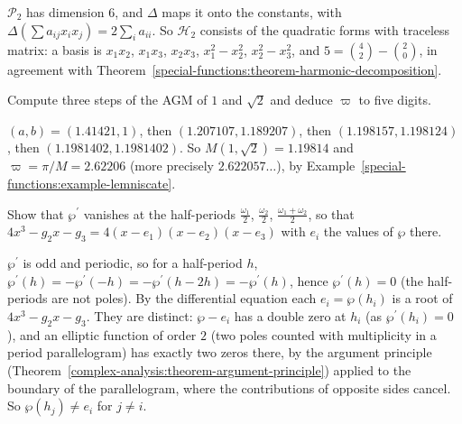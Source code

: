 \begin{solution}
$\mathcal{P}_2$ has dimension $6$, and $\Delta$ maps it onto the constants, with $\Delta(\sum a_{ij}x_ix_j) = 2\sum_ia_{ii}$. So $\mathcal{H}_2$ consists of the quadratic forms with traceless matrix: a basis is
$x_1x_2$, $x_1x_3$, $x_2x_3$, $x_1^2 - x_2^2$, $x_2^2 - x_3^2$, and $5 = \binom42 - \binom20$, in agreement with Theorem~\ref{special-functions:theorem-harmonic-decomposition}.
\end{solution}

\begin{exercise}\label{special-functions:exercise-agm-numerics}
Compute three steps of the AGM of $1$ and $\sqrt2$ and deduce $\varpi$ to five digits.
\end{exercise}

\begin{solution}
$(a, b) = (1.41421, 1)$, then $(1.207107, 1.189207)$, then $(1.198157, 1.198124)$, then $(1.1981402, 1.1981402)$. So $M(1, \sqrt2) = 1.19814$ and $\varpi = \pi/M = 2.62206$ (more precisely $2.622057\ldots$),
by Example~\ref{special-functions:example-lemniscate}.
\end{solution}

\begin{exercise}\label{special-functions:exercise-wp-half-periods}
Show that $\wp^{\prime}$ vanishes at the half-periods $\frac{\omega_1}{2}$, $\frac{\omega_2}{2}$, $\frac{\omega_1 + \omega_2}{2}$, so that $4x^3 - g_2x - g_3 = 4(x - e_1)(x - e_2)(x - e_3)$ with $e_i$ the values of $\wp$ there.
\end{exercise}

\begin{solution}
$\wp^{\prime}$ is odd and periodic, so for a half-period $h$, $\wp^{\prime}(h) = -\wp^{\prime}(-h) = -\wp^{\prime}(h - 2h) = -\wp^{\prime}(h)$, hence $\wp^{\prime}(h) = 0$ (the half-periods are not poles). By the differential equation each
$e_i = \wp(h_i)$ is a root of $4x^3 - g_2x - g_3$. They are distinct: $\wp - e_i$ has a double zero at $h_i$ (as $\wp^{\prime}(h_i) = 0$), and an elliptic function of order $2$ (two poles counted with multiplicity in a period
parallelogram) has exactly two zeros there, by the argument principle (Theorem~\ref{complex-analysis:theorem-argument-principle}) applied to the boundary of the parallelogram, where the contributions of opposite sides cancel.
So $\wp(h_j) \neq e_i$ for $j \neq i$.
\end{solution}
